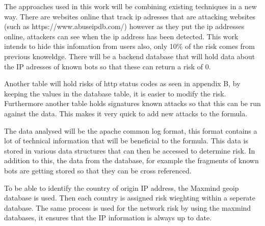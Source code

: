 The approaches used in this work will be combining existing techniques in a new way. There are websites online that track ip adresses that are attacking websites (such as https://www.abuseipdb.com/) however as they put the ip addresses online, attackers can see when the ip address has been detected. This work intends to hide this infomation from users also, only 10\% of the risk comes from previous knoweldge. There will be a backend database that will hold data about the IP adresses of known bots so that these can return a risk of 0. 

Another table will hold risks of http status codes as  seen in appendix B, by keeping the values in the database table, it is easier to modify the risk. Furthermore another table holds signatures known attacks so that this can be run against the data. This makes it very quick to add new attacks to the formula.

The data analysed will be the apache common log format, this format contains a lot of technical information that will be beneficial to the formula. This data is stored in various data structures that can then be accessed to determine risk. In addition to this, the data from the database, for example the fragments of known bots are getting stored so that they can be cross referenced.  

To be able to identify the country of origin IP address, the Maxmind geoip database is used. Then each country is assigned risk wieghting within a seperate database. The same process is used for the network risk by using the maxmind databases, it ensures that the IP information is always up to date.